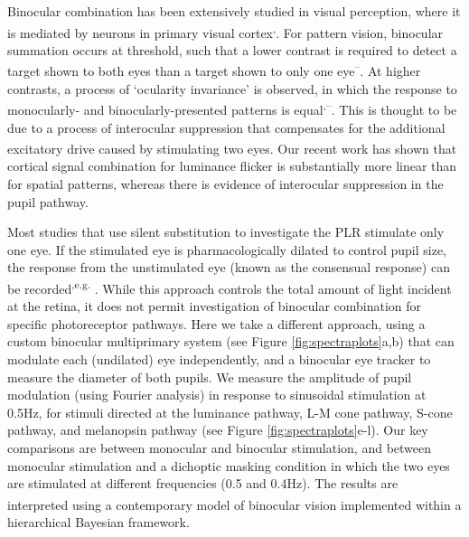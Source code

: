 \documentclass[
]{article}
\begin{document}
Binocular combination has been extensively studied in visual perception, where it is mediated by neurons in primary visual cortex\textsuperscript{,}. For pattern vision, binocular summation occurs at threshold, such that a lower contrast is required to detect a target shown to both eyes than a target shown to only one eye\textsuperscript{--}. At higher contrasts, a process of `ocularity invariance' is observed, in which the response to monocularly- and binocularly-presented patterns is equal\textsuperscript{,--}. This is thought to be due to a process of interocular suppression that compensates for the additional excitatory drive caused by stimulating two eyes. Our recent work\textsuperscript{} has shown that cortical signal combination for luminance flicker is substantially more linear than for spatial patterns, whereas there is evidence of interocular suppression in the pupil pathway.

Most studies that use silent substitution to investigate the PLR stimulate only one eye. If the stimulated eye is pharmacologically dilated to control pupil size, the response from the unstimulated eye (known as the consensual response) can be recorded\textsuperscript{,e.g. }. While this approach controls the total amount of light incident at the retina, it does not permit investigation of binocular combination for specific photoreceptor pathways. Here we take a different approach, using a custom binocular multiprimary system (see Figure \ref{fig:spectraplots}a,b) that can modulate each (undilated) eye independently, and a binocular eye tracker to measure the diameter of both pupils. We measure the amplitude of pupil modulation (using Fourier analysis) in response to sinusoidal stimulation at 0.5Hz, for stimuli directed at the luminance pathway, L-M cone pathway, S-cone pathway, and melanopsin pathway (see Figure \ref{fig:spectraplots}e-l). Our key comparisons are between monocular and binocular stimulation, and between monocular stimulation and a dichoptic masking condition in which the two eyes are stimulated at different frequencies (0.5 and 0.4Hz). The results are interpreted using a contemporary model of binocular vision\textsuperscript{} implemented within a hierarchical Bayesian framework.
\end{document}
